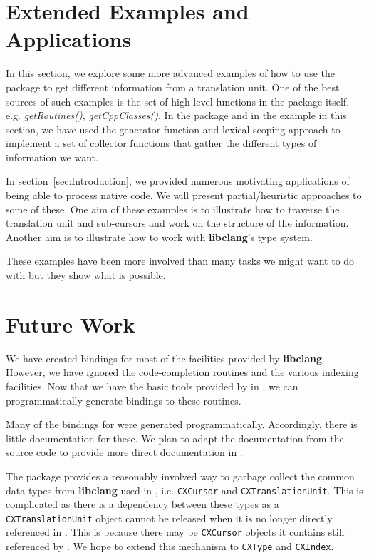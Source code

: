\documentclass[article]{jss}
\def\C{\proglang{C}}
\def\R{\proglang{R}}
\def\Rpkg#1{\pkg{#1}}
\def\Rfunc#1{\textsl{#1()}}
\def\Ctype#1{\texttt{#1}}
\def\libclang{\textbf{libclang}}
\begin{document}
\section{Extended Examples and Applications}\label{sec:Examples}
In this section, we explore some more advanced examples of how to use
the \Rpkg{RCIndex} package to get different information from a
translation unit.  One of the best sources of such examples is the set
of high-level functions in the package itself,
e.g. \Rfunc{getRoutines}, \Rfunc{getCppClasses}.  In the package and
in the example in this section, we have used the generator function
and lexical scoping approach to implement a set of collector functions
that gather the different types of information we want.

In section~\ref{sec:Introduction}, we provided numerous motivating
applications of being able to process native code.  We will present
partial/heuristic approaches to some of these.  One aim of these
examples is to illustrate how to traverse the translation unit and
sub-cursors and work on the structure of the information.  Another aim
is to illustrate how to work with \libclang's type system.







These examples have been more involved than many tasks we might want
to do with \Rpkg{RCIndex} but they show what is possible. 





\section{Future Work}

We have created bindings for most of the facilities provided by
\libclang.  However, we have ignored the code-completion routines and
the various indexing facilities.  Now that we have the basic tools
provided by \Rpkg{RCIndex} in \R, we can programmatically generate
bindings to these routines. 

Many of the bindings for \Rpkg{RCIndex} were generated
programmatically. Accordingly, there is little documentation for
these. We plan to adapt the documentation from the source code
to provide more direct documentation in \R.

The package provides a reasonably involved way to garbage collect the
common \C{} data types from \libclang{} used in \R,
i.e. \Ctype{CXCursor} and \Ctype{CXTranslationUnit}.  This is
complicated as there is a dependency between these types as a
\Ctype{CXTranslationUnit} object cannot be released when it is no
longer directly referenced in \R. This is because there may be
\Ctype{CXCursor} objects it contains still referenced by \R.  We hope
to extend this mechanism to \Ctype{CXType} and \Ctype{CXIndex}.
\end{document}
